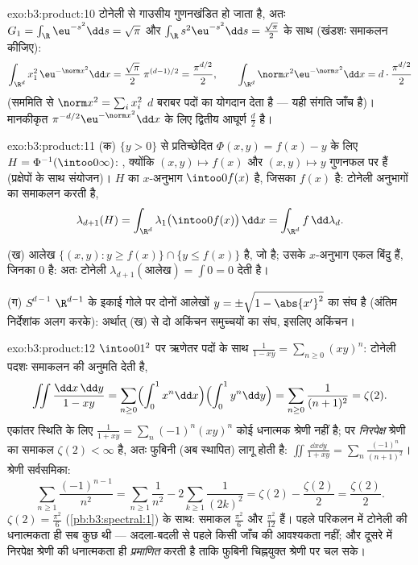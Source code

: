 \begin{solution}{exo:b3:product:10}
टोनेली से गाउसीय गुणनखंडित हो जाता है, अतः $G_1 =
\int_\R\eu^{-s^2}\dd s = \sqrt\pi$ और $\int_\R
s^2\eu^{-s^2}\dd s = \frac{\sqrt\pi}2$ के साथ
(खंडशः समाकलन कीजिए):
\[
\int_{\R^d}x_1^2\,\eu^{-\norm x^2}\dd x =
\frac{\sqrt\pi}2\;\pi^{(d-1)/2} = \frac{\pi^{d/2}}2,
\qquad
\int_{\R^d}\norm x^2\eu^{-\norm x^2}\dd x =
d\cdot\frac{\pi^{d/2}}2
\]
(सममिति से $\norm x^2 = \sum_ix_i^2$ $d$ बराबर पदों का योगदान देता है --- यही संगति
जाँच है)। मानकीकृत  $\pi^{-d/2}\eu^{-\norm x^2}\dd x$ के लिए द्वितीय आघूर्ण $\frac d2$ है।
\end{solution}

\begin{solution}{exo:b3:product:11}
(क) $\{y > 0\}$ से प्रतिच्छेदित $\Phi(x, y) = f(x) -
y$ के लिए $H = \Phi^{-1}(\intoo0\infty)$: , क्योंकि $(x, y)
\mapsto f(x)$
और $(x,y)\mapsto y$ गुणनफल पर  हैं (प्रक्षेपों के साथ संयोजन)। $H$ का
$x$-अनुभाग $\intoo0{f(x)}$ है, जिसका  $f(x)$ है: टोनेली अनुभागों का समाकलन
करती है,
\[
\lambda_{d+1}(H) = \int_{\R^d}\lambda_1\bigl(\intoo0{f(x)}
\bigr)\,\dd x = \int_{\R^d}f\,\dd\lambda_d .
\]

(ख) आलेख $\{(x,y) : y \geq f(x)\} \cap \{y \leq
f(x)\}$ है, जो  है; उसके $x$-अनुभाग एकल बिंदु हैं,
जिनका  $0$ है: अतः टोनेली $\lambda_{d+1}(\text{आलेख}) =
\int 0 = 0$ देती है।

(ग) $S^{d-1}$ $\R^{d-1}$ के इकाई गोले पर दोनों आलेखों $y =
\pm\sqrt{1 - \abs{x'}^2}$ का संघ है (अंतिम
निर्देशांक अलग करके): अर्थात् (ख) से दो अकिंचन समुच्चयों का संघ,
इसलिए अकिंचन।
\end{solution}

\begin{solution}{exo:b3:product:12}
$\intoo01^2$ पर ऋणेतर पदों के साथ $\frac1{1 - xy} = \sum_{n\geq0}(xy)^n$: टोनेली पदशः समाकलन की अनुमति देती
है,
\[
\iint\frac{\dd x\,\dd y}{1 - xy}
= \sum_{n\geq0}\Bigl(\int_0^1x^n\dd x\Bigr)
\Bigl(\int_0^1y^n\dd y\Bigr)
= \sum_{n\geq0}\frac1{(n+1)^2} = \zeta(2) .
\]
एकांतर स्थिति के लिए $\frac1{1 + xy} =
\sum_n(-1)^n(xy)^n$ कोई धनात्मक श्रेणी नहीं है; पर \emph{निरपेक्ष}
श्रेणी का समाकल $\zeta(2) <
\infty$ है, अतः फुबिनी (अब  स्थापित) लागू
होती है: $\iint\frac{\dd x\dd y}{1 + xy} =
\sum_n\frac{(-1)^n}{(n+1)^2}$। श्रेणी सर्वसमिका:
\[
\sum_{n\geq1}\frac{(-1)^{n-1}}{n^2}
= \sum_{n\geq1}\frac1{n^2} - 2\sum_{k\geq1}\frac1{(2k)^2}
= \zeta(2) - \frac{\zeta(2)}2 = \frac{\zeta(2)}2 .
\]
$\zeta(2) = \frac{\pi^2}6$ (\cref{pb:b3:spectral:1}) के साथ: समाकल $\frac{\pi^2}6$ और $\frac{\pi^2}{12}$ हैं। पहले परिकलन में
टोनेली की धनात्मकता ही सब कुछ थी --- अदला-बदली से पहले किसी 
जाँच की आवश्यकता नहीं; और दूसरे में निरपेक्ष श्रेणी की धनात्मकता ही
 \emph{प्रमाणित} करती है ताकि फुबिनी चिह्नयुक्त श्रेणी पर
चल सके।
\end{solution}

